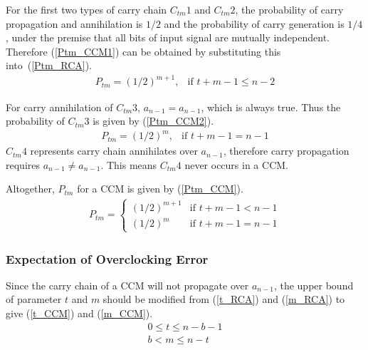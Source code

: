 \documentclass[journal]{IEEEtran}
\begin{document}
For the first two types of carry chain $C_{tm}1$ and $C_{tm}2$, the probability of carry propagation and annihilation is $1/2$ and the probability of carry generation is $1/4$, under the premise that all bits of input signal are mutually independent. Therefore (\ref{Ptm_CCM1}) can be obtained by substituting this into~(\ref{Ptm_RCA}).
%
\begin{eqnarray}\label{Ptm_CCM1}
  P_{tm}=\left(1/2\right)^{m+1}, & \textrm{if $t+m-1\leqslant n-2$}
\end{eqnarray}

For carry annihilation of $C_{tm}3$, $a_{n-1}=a_{n-1}$, which is always true. Thus the probability of $C_{tm}3$ is given by (\ref{Ptm_CCM2}).
%
\begin{eqnarray}\label{Ptm_CCM2}
  P_{tm}=\left(1/2\right)^m, & \textrm{if $t+m-1=n-1$}
\end{eqnarray}
$C_{tm}4$ represents carry chain annihilates over $a_{n-1}$, therefore carry propagation requires $a_{n-1}\neq a_{n-1}$. This means $C_{tm}4$ never occurs in a CCM.

Altogether, $P_{tm}$ for a CCM is given by (\ref{Ptm_CCM}).
\begin{eqnarray}\label{Ptm_CCM}
  P_{tm}=\left\{\begin{array}{ll}
      (1/2)^{m+1} & \textrm{if $t+m-1<n-1$}\\
      (1/2)^{m} & \textrm{if $t+m-1=n-1$}
    \end{array} \right.
\end{eqnarray}

\subsubsection{Expectation of Overclocking Error}
Since the carry chain of a CCM will not propagate over $a_{n-1}$, the upper bound of parameter $t$ and $m$ should be modified from (\ref{t_RCA}) and (\ref{m_RCA}) to give (\ref{t_CCM}) and (\ref{m_CCM}).
%
\begin{eqnarray}
  \label{t_CCM} 0\leqslant t\leqslant n-b-1\\
  \label{m_CCM} b<m\leqslant n-t
\end{eqnarray}
\end{document}
